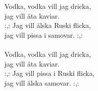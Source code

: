 
            Vodka, vodka vill jag dricka, \\
            jag vill äta kaviar. \\
            :,: Jag vill älska Ruski flicka, \\
            jag vill pissa i samovar. :,: \\
\hspace{10mm} \\
            Vodka, vodka vill jag dricka, \\
            jag vill äta kaviar. \\
            :,: Jag vill pissa i Ruski flicka, \\
            jag vill älska samovar. :,: \\
